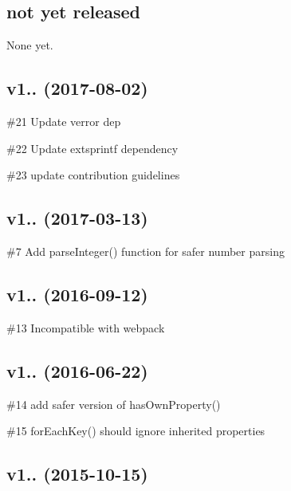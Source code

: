 \subsection*{not yet released}

None yet.

\subsection*{v1.. (2017-\/08-\/02)}


\begin{DoxyItemize}
\item \#21 Update verror dep
\item \#22 Update extsprintf dependency
\item \#23 update contribution guidelines
\end{DoxyItemize}

\subsection*{v1.. (2017-\/03-\/13)}


\begin{DoxyItemize}
\item \#7 Add parse\+Integer() function for safer number parsing
\end{DoxyItemize}

\subsection*{v1.. (2016-\/09-\/12)}


\begin{DoxyItemize}
\item \#13 Incompatible with webpack
\end{DoxyItemize}

\subsection*{v1.. (2016-\/06-\/22)}


\begin{DoxyItemize}
\item \#14 add safer version of has\+Own\+Property()
\item \#15 for\+Each\+Key() should ignore inherited properties
\end{DoxyItemize}

\subsection*{v1.. (2015-\/10-\/15)}


